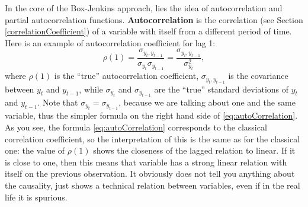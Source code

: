 \documentclass[
]{book}
\theoremstyle{definition}
\theoremstyle{definition}
\theoremstyle{definition}
\theoremstyle{definition}
\theoremstyle{remark}
\begin{document}
In the core of the Box-Jenkins approach, lies the idea of autocorrelation and partial autocorrelation functions. \textbf{Autocorrelation} is the correlation (see Section \ref{correlationCoefficient}) of a variable with itself from a different period of time. Here is an example of autocorrelation coefficient for lag 1:
\begin{equation}
  \rho(1) = \frac{\sigma_{y_t,y_{t-1}}}{\sigma_{y_t}\sigma_{y_{t-1}}} = \frac{\sigma_{y_t,y_{t-1}}}{\sigma_{y_t}^2},
  \label{eq:autoCorrelation}
\end{equation}
where \(\rho(1)\) is the ``true'' autocorrelation coefficient, \(\sigma_{y_t,y_{t-1}}\) is the covariance between \(y_t\) and \(y_{t-1}\), while \(\sigma_{y_t}\) and \(\sigma_{y_{t-1}}\) are the ``true'' standard deviations of \(y_t\) and \(y_{t-1}\). Note that \(\sigma_{y_t}=\sigma_{y_{t-1}}\), because we are talking about one and the same variable, thus the simpler formula on the right hand side of \eqref{eq:autoCorrelation}. As you see, the formula \eqref{eq:autoCorrelation} corresponds to the classical correlation coefficient, so the interpretation of this is the same as for the classical one: the value of \(\rho(1)\) shows the closeness of the lagged relation to linear. If it is close to one, then this means that variable has a strong linear relation with itself on the previous observation. It obviously does not tell you anything about the causality, just shows a technical relation between variables, even if in the real life it is spurious.
\end{document}
